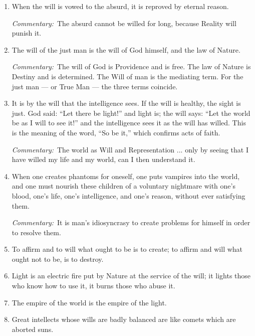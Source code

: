 \begin{enumerate}[label=\Roman*.]
\textit{Commentary:}~A soft life makes man weak. The Will needs opposition and friction.

\item When the will is vowed to the absurd, it is reproved by eternal reason.

\textit{Commentary:}~The absurd cannot be willed for long, because Reality will punish it.

\item The will of the just man is the will of God himself, and the law of Nature.

\textit{Commentary:}~The will of God is Providence and is free. The law of Nature is Destiny and is determined. The Will of man is the mediating term. For the just man --- or True Man --- the three terms coincide.

\item It is by the will that the intelligence sees. If the will is healthy, the sight is just. God said: ``Let there be light!'' and light is; the will says: ``Let the world be as I will to see it!'' and the intelligence sees it as the will has willed. This is the meaning of the word, ``So be it,'' which confirms acts of faith.

\textit{Commentary:}~The world as Will and Representation ... only by seeing that I have willed my life and my world, can I then understand it.

\item When one creates phantoms for oneself, one puts vampires into the world, and one must nourish these children of a voluntary nightmare with one's blood, one's life, one's intelligence, and one's reason, without ever satisfying them.

\textit{Commentary:}~It is man's idiosyncrasy to create problems for himself in order to resolve them.

\item To affirm and to will what ought to be is to create; to affirm and will what ought not to be, is to destroy.

\item Light is an electric fire put by Nature at the service of the will; it lights those who know how to use it, it burns those who abuse it.

\item The empire of the world is the empire of the light.

\item Great intellects whose wills are badly balanced are like comets which are aborted suns.


\end{enumerate}
